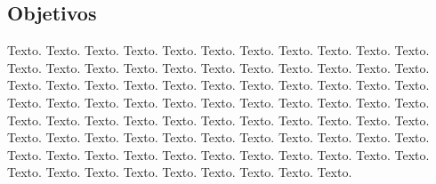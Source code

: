     \subsection{Objetivos}

\begin{onehalfspacing}
    \begin{justify}
        \begin{large}
            Texto. Texto. Texto. Texto. Texto. Texto. Texto. Texto. Texto. Texto. Texto. Texto. Texto. Texto. Texto. Texto. Texto. Texto. Texto. Texto. Texto. Texto. Texto. Texto. Texto. Texto. Texto. Texto. Texto. Texto. Texto. Texto. Texto. Texto. Texto. Texto. Texto. Texto. Texto. Texto. Texto. Texto. Texto. Texto. Texto. Texto. Texto. Texto. Texto. Texto. Texto. Texto. Texto. Texto. Texto. Texto. Texto. Texto. Texto. Texto. Texto. Texto. Texto. Texto. Texto. Texto. Texto. Texto. Texto. Texto. Texto. Texto. Texto. Texto. Texto. Texto. Texto. Texto. Texto. Texto. Texto. Texto. Texto. Texto. Texto. Texto.
        \end{large}
    \end{justify}
\end{onehalfspacing}

